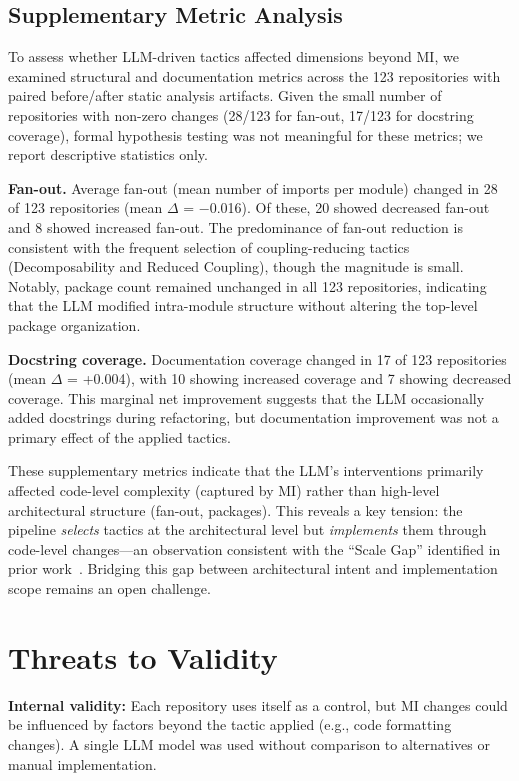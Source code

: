 \documentclass[sigconf,review,anonymous]{acmart}
\begin{document}
\subsection{Supplementary Metric Analysis}
To assess whether LLM-driven tactics affected dimensions beyond MI, we examined structural and documentation metrics across the 123 repositories with paired before/after static analysis artifacts. Given the small number of repositories with non-zero changes (28/123 for fan-out, 17/123 for docstring coverage), formal hypothesis testing was not meaningful for these metrics; we report descriptive statistics only.

\textbf{Fan-out.} Average fan-out (mean number of imports per module) changed in 28 of 123 repositories (mean $\Delta$ = $-$0.016). Of these, 20 showed decreased fan-out and 8 showed increased fan-out. The predominance of fan-out reduction is consistent with the frequent selection of coupling-reducing tactics (Decomposability and Reduced Coupling), though the magnitude is small. Notably, package count remained unchanged in all 123 repositories, indicating that the LLM modified intra-module structure without altering the top-level package organization.

\textbf{Docstring coverage.} Documentation coverage changed in 17 of 123 repositories (mean $\Delta$ = +0.004), with 10 showing increased coverage and 7 showing decreased coverage. This marginal net improvement suggests that the LLM occasionally added docstrings during refactoring, but documentation improvement was not a primary effect of the applied tactics.

These supplementary metrics indicate that the LLM's interventions primarily affected code-level complexity (captured by MI) rather than high-level architectural structure (fan-out, packages). This reveals a key tension: the pipeline \textit{selects} tactics at the architectural level but \textit{implements} them through code-level changes---an observation consistent with the ``Scale Gap'' identified in prior work~\cite{horikawa2025agentic}. Bridging this gap between architectural intent and implementation scope remains an open challenge.

\section{Threats to Validity}

\textbf{Internal validity:} Each repository uses itself as a control, but MI changes could be influenced by factors beyond the tactic applied (e.g., code formatting changes). A single LLM model was used without comparison to alternatives or manual implementation.
\end{document}
